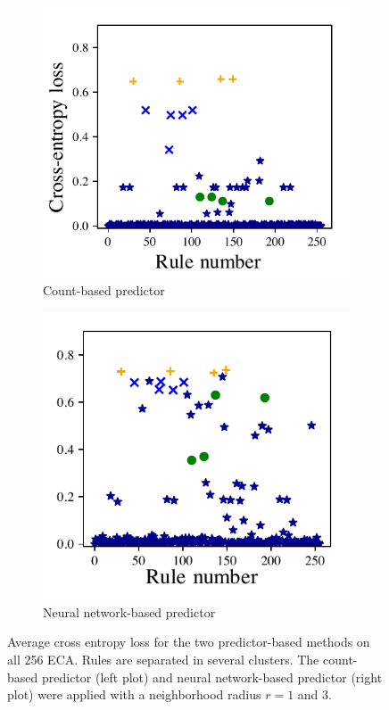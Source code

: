 \begin{figure}[htbp]
  \centering
  \begin{subfigure}[b]{.48\linewidth}
    \centering
    \includegraphics[width=\linewidth]{figures/count}
    \caption{Count-based predictor}
      \label{subfig:cross_ent_one}
  \end{subfigure}
  \begin{subfigure}[b]{.4503\linewidth}
    \centering
    \includegraphics[width=\linewidth]{figures/nn}
    \caption{Neural network-based predictor}
      \label{subfig:nn_ent_one}
  \end{subfigure}

  \caption{Average cross entropy loss for the two predictor-based methods on all
    256 ECA. Rules are separated in several clusters. The
    count-based predictor (left plot) and neural network-based predictor (right
    plot) were applied with a neighborhood radius $r=1$ and $3$.}
\end{figure}

